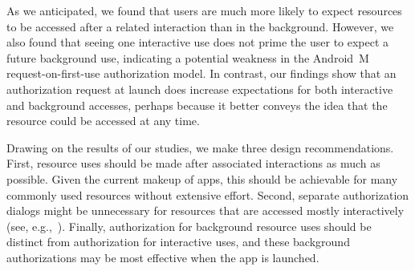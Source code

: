 
As we anticipated, we found that users are much more likely to expect 
resources to be accessed after a related interaction than in the 
background. However, we also found that seeing one 
interactive use does not prime the user to expect a future 
background use, indicating a potential weakness in the Android~M request-on-first-use 
authorization model. In contrast, our findings show that an 
authorization request at launch does increase expectations for 
both interactive and background accesses, perhaps because it better conveys the idea that 
the resource could be accessed at any time.


Drawing on the results of our studies, we make three design 
recommendations. First, resource uses should be made after associated 
interactions as much as possible. Given the current makeup of apps, this 
should be achievable for many commonly used resources without extensive 
effort. Second, separate authorization dialogs might be unnecessary
for resources that are accessed mostly interactively (see, e.g.,~\cite{Roesner:2012}). 
Finally, authorization for background resource uses should be distinct 
from authorization for interactive uses, and these background authorizations 
may be most effective when the app is launched. 


